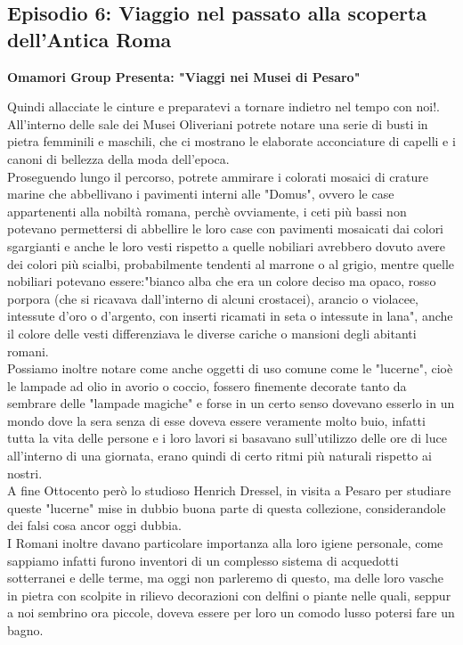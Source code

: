 \documentclass[hidelinks,12pt,a4paper]{article}
\begin{document}
\begin{flushleft}
		\subsection{Episodio 6: Viaggio nel passato alla scoperta dell'Antica Roma}
		\begin{center}
			\textbf{Omamori Group Presenta: "Viaggi nei Musei di Pesaro"}
		\end{center}
		Quindi allacciate le cinture e preparatevi a tornare indietro nel tempo con noi!.\\
		All'interno delle sale dei Musei Oliveriani potrete notare una serie di busti in pietra femminili e maschili, che ci mostrano le elaborate acconciature di capelli e i canoni di bellezza della moda dell'epoca.\\ 
		Proseguendo lungo il percorso, potrete ammirare i colorati mosaici di crature marine che abbellivano i pavimenti interni alle "Domus", ovvero le case appartenenti alla nobiltà romana, perchè ovviamente, i ceti più bassi non potevano permettersi di abbellire le loro case con pavimenti mosaicati dai colori sgargianti e anche le loro vesti rispetto a quelle nobiliari avrebbero dovuto avere dei colori più scialbi, probabilmente tendenti al marrone o al grigio, mentre quelle nobiliari potevano essere:"bianco alba che era un colore deciso ma opaco, rosso porpora (che si ricavava dall'interno di alcuni crostacei), arancio o violacee, intessute d'oro o d'argento, con inserti ricamati in seta o intessute in lana", anche il colore delle vesti differenziava le diverse cariche o mansioni degli abitanti romani.\\
		Possiamo inoltre notare come anche oggetti di uso comune come le "lucerne", cioè le lampade ad olio in avorio o coccio, fossero finemente decorate tanto da sembrare delle "lampade magiche" e forse in un certo senso dovevano esserlo in un mondo dove la sera senza di esse doveva essere veramente molto buio, infatti tutta la vita delle persone e i loro lavori si basavano sull'utilizzo delle ore di luce all'interno di una giornata, erano quindi di certo ritmi più naturali rispetto ai nostri.\\
		A fine Ottocento però lo studioso Henrich Dressel, in visita a Pesaro per studiare queste "lucerne" mise in dubbio buona parte di questa collezione, considerandole dei falsi cosa ancor oggi dubbia.\\
		I Romani inoltre davano particolare importanza alla loro igiene personale, come sappiamo infatti furono inventori di un complesso sistema di acquedotti sotterranei e delle terme, ma oggi non parleremo di questo, ma delle loro vasche in pietra con scolpite in rilievo decorazioni con delfini o piante nelle quali, seppur a noi sembrino ora piccole, doveva essere per loro un comodo lusso potersi fare un bagno.\\

\end{flushleft}
\end{document}
